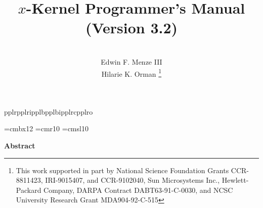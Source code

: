 % 
%
%
%
%
%


\setcounter{tocdepth}{5}




\makeatletter
{}%
{pplr}{pplri}{pplb}{pplbi}{pplrc}{pplro}
\makeatother
\def\caps{\family{palatino}\size{12}{12pt}\selectfont}

\makeatother
\def\nintt{\family{helvetica}\size{9}{11pt}\selectfont}
\makeatother
\def\sanss{\family{helvetica}\size{11}{11pt}\selectfont}
\makeatother
\def\smalltt{\family{courier}\size{9}{11pt}\selectfont}

\newcommand{\COURIERtt}{\fontfamily{courier}\size{9}{11pt}\selectfont}
\newcommand{\CMRtt}{\fontfamily{cmtt}\selectfont}

\font\bold=cmbx12
\font\smallfont=cmr10
\font\sem=cmsl10

\def\xk{$x$-kernel}

\title{$x$-Kernel Programmer's Manual \\ {\rm (Version 3.2)}}
\author{\\ Edwin F. Menze III\\ Hilarie K. Orman \thanks
{This work supported in part by 
National Science Foundation Grants CCR-8811423, IRI-9015407, and CCR-9102040, 
Sun Microsystems Inc., 
Hewlett-Packard Company, 
DARPA Contract DABT63-91-C-0030,
and NCSC University Research Grant MDA904-92-C-515
}}
\maketitle{}

\begin{center}
{\bf\Large Abstract}
\end{center}
\begin{quote}

\end{quote}

%


\renewcommand\baselinestretch{1}
\small\normalsize

\newpage{}
\makeatletter
\def\@dottedtocline#1#2#3#4#5{\ifnum #1>\c@tocdepth \else
  \vskip \z@ plus.2\p@
  {\leftskip #2\relax \rightskip \@tocrmarg \parfillskip -\rightskip
    \parindent #2\relax\@afterindenttrue
   \interlinepenalty\@M
   \leavevmode
   \@tempdima #3\relax \advance\leftskip \@tempdima \hbox{}\hskip -\leftskip
    #4\nobreak\leaders\hbox{$\m@th \mkern \@dotsep mu\mathchar"012E\mkern \@dotsep
       mu$}\hfill \nobreak
           \hbox to\@pnumwidth{\hfil\reset@font\rm #5}\par}\fi}
\makeatother

